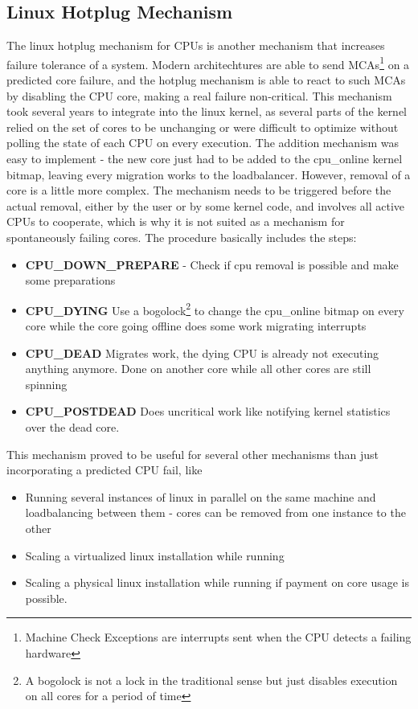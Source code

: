 \documentclass[a4paper,10pt,twoside]{article}
\begin{document}
\subsection{Linux Hotplug Mechanism} \label{hotplug}
The linux hotplug mechanism for CPUs \cite{Linux_Hotplug} is another mechanism that increases failure tolerance of a system. Modern architechtures are able to send MCAs\footnote{Machine Check Exceptions are interrupts sent when the CPU detects a failing hardware} on a predicted core failure, and the hotplug mechanism is able to react to such MCAs by disabling the CPU core, making a real failure non-critical. This mechanism took several years to integrate into the linux kernel, as several parts of the kernel relied on the set of cores to be unchanging or were difficult to optimize without polling the state of each CPU on every execution. The addition mechanism was easy to implement - the new core just had to be added to the cpu\_online kernel bitmap, leaving every migration works to the loadbalancer. However, removal of a core is a little more complex. The mechanism needs to be triggered before the actual removal, either by the user or by some kernel code, and involves all active CPUs to cooperate, which is why it is not suited as a mechanism for spontaneously failing cores. The procedure basically includes the steps:
\begin{itemize}
	\item \textbf{CPU\_DOWN\_PREPARE} - Check if cpu removal is possible and make some preparations
	\item \textbf{CPU\_DYING} Use a bogolock\footnote{A bogolock is not a lock in the traditional sense but just disables execution on all cores for a period of time} to change the cpu\_online bitmap on every core while the core going offline does some work migrating interrupts
	\item \textbf{CPU\_DEAD} Migrates work, the dying CPU is already not executing anything anymore. Done on another core while all other cores are still spinning
	\item \textbf{CPU\_POSTDEAD} Does uncritical work like notifying kernel statistics over the dead core.
\end{itemize}

This mechanism proved to be useful for several other mechanisms than just incorporating a predicted CPU fail, like
\begin{itemize}
	\item Running several instances of linux in parallel on the same machine and loadbalancing between them - cores can be removed from one instance to the other
	\item Scaling a virtualized linux installation while running
	\item Scaling a physical linux installation while running if payment on core usage is possible.
\end{itemize}
\end{document}
